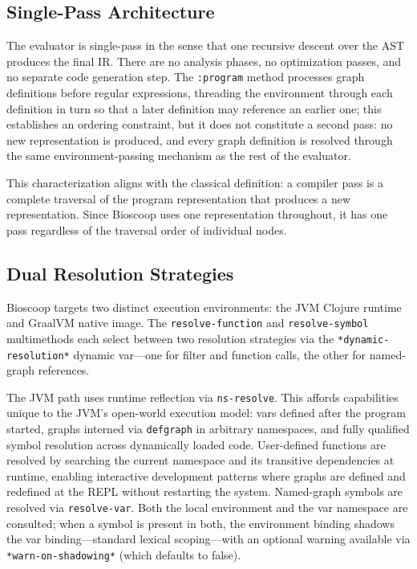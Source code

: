 \documentclass[english,submission]{programming}
\begin{document}
\subsection{Single-Pass Architecture}

The evaluator is single-pass in the sense that one recursive descent over the AST produces the final IR. There are no analysis phases, no optimization passes, and no separate code generation step. The \texttt{:program} method processes graph definitions before regular expressions, threading the environment through each definition in turn so that a later definition may reference an earlier one; this establishes an ordering constraint, but it does not constitute a second pass: no new representation is produced, and every graph definition is resolved through the same environment-passing mechanism as the rest of the evaluator.

This characterization aligns with the classical definition: a compiler pass is a complete traversal of the program representation that produces a new representation. Since Bioscoop uses one representation throughout, it has one pass regardless of the traversal order of individual nodes.

\subsection{Dual Resolution Strategies}

Bioscoop targets two distinct execution environments: the JVM Clojure runtime and GraalVM native image. The \texttt{resolve-function} and \texttt{resolve-symbol} multimethods each select between two resolution strategies via the \texttt{*dynamic-resolution*} dynamic var---one for filter and function calls, the other for named-graph references.

The JVM path uses runtime reflection via \texttt{ns-resolve}. This affords capabilities unique to the JVM's open-world execution model: vars defined after the program started, graphs interned via \texttt{defgraph} in arbitrary namespaces, and fully qualified symbol resolution across dynamically loaded code. User-defined functions are resolved by searching the current namespace and its transitive dependencies at runtime, enabling interactive development patterns where graphs are defined and redefined at the REPL without restarting the system. Named-graph symbols are resolved via \texttt{resolve-var}. Both the local environment and the var namespace are consulted; when a symbol is present in both, the environment binding shadows the var binding---standard lexical scoping---with an optional warning available via \texttt{*warn-on-shadowing*} (which defaults to false).
\end{document}
